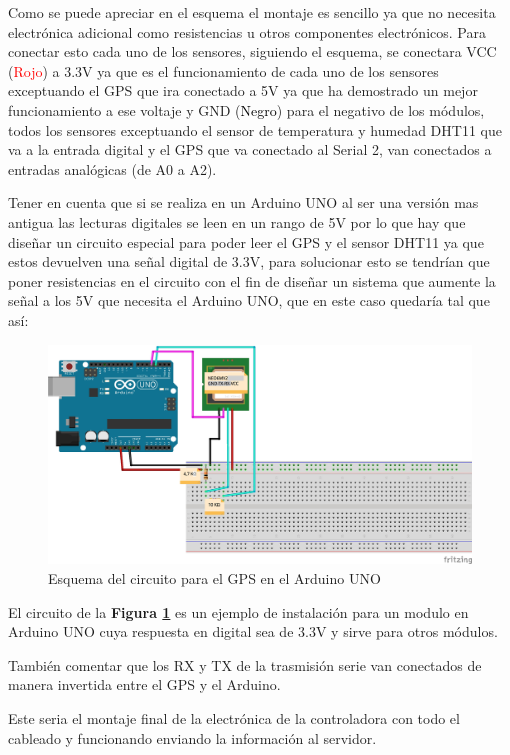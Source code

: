 Como se puede apreciar en el esquema el montaje es sencillo ya que no necesita electrónica adicional como resistencias u otros componentes electrónicos. Para conectar esto cada uno de los sensores, siguiendo el esquema, se conectara VCC (\textcolor{red}{Rojo}) a 3.3V ya que es el funcionamiento de cada uno de los sensores exceptuando el GPS que ira conectado a 5V ya que ha demostrado un mejor funcionamiento a ese voltaje y GND (\textcolor{black}{Negro}) para el negativo de los módulos, todos los sensores exceptuando el sensor de temperatura y humedad DHT11 que va a la entrada digital y el GPS que va conectado al Serial 2, van conectados a entradas analógicas (de A0 a A2).

Tener en cuenta que si se realiza en un Arduino UNO al ser una versión mas antigua las lecturas digitales se leen en un rango de 5V por lo que hay que diseñar un circuito especial para poder leer el GPS y el sensor DHT11 ya que estos devuelven una señal digital de 3.3V, para solucionar esto se tendrían que poner resistencias en el circuito con el fin de diseñar un sistema que aumente la señal a los 5V que necesita el Arduino UNO, que en este caso quedaría tal que así:

\begin{figure}[!h]
	\centering
	\includegraphics[width=0.9\linewidth]{figuras/unogps}
	\caption{Esquema del circuito para el GPS en el Arduino UNO}
	\label{fig:imgunogps}
\end{figure}

El circuito de la \textbf{Figura \ref{fig:imgunogps}} es un ejemplo de instalación para un modulo en Arduino UNO cuya respuesta en digital sea de 3.3V y sirve para otros módulos.

También comentar que los RX y TX de la trasmisión serie van conectados de manera invertida entre el GPS y el Arduino.

Este seria el montaje final de la electrónica de la controladora con todo el cableado y funcionando enviando la información al servidor.

